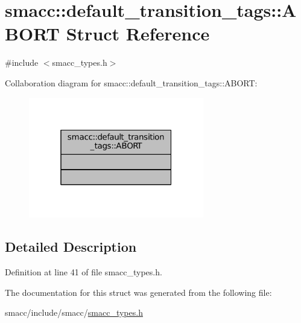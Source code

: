 \hypertarget{structsmacc_1_1default__transition__tags_1_1ABORT}{}\section{smacc\+:\+:default\+\_\+transition\+\_\+tags\+:\+:A\+B\+O\+RT Struct Reference}
\label{structsmacc_1_1default__transition__tags_1_1ABORT}


{\ttfamily \#include $<$smacc\+\_\+types.\+h$>$}



Collaboration diagram for smacc\+:\+:default\+\_\+transition\+\_\+tags\+:\+:A\+B\+O\+RT\+:
\nopagebreak
\begin{figure}[H]
\begin{center}
\leavevmode
\includegraphics[width=217pt]{structsmacc_1_1default__transition__tags_1_1ABORT__coll__graph}
\end{center}
\end{figure}


\subsection{Detailed Description}


Definition at line 41 of file smacc\+\_\+types.\+h.



The documentation for this struct was generated from the following file\+:\begin{DoxyCompactItemize}
\item 
smacc/include/smacc/\hyperlink{smacc__types_8h}{smacc\+\_\+types.\+h}\end{DoxyCompactItemize}
